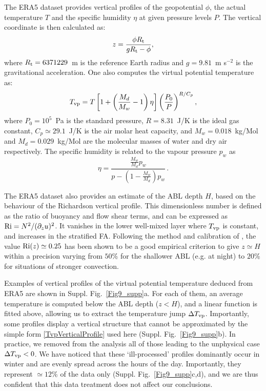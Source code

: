 The ERA5 dataset provides vertical profiles of the geopotential $\phi$, the actual temperature $T$ and the specific humidity $\eta$ at given pressure levels $P$. The vertical coordinate is then calculated as:
%
\begin{equation}
z = \frac{\phi R_{\textup{t}}}{g R_{\textup{t}} - \phi},
\end{equation}
%
where $R_{\textup{t}} = 6371229$~m is the reference Earth radius and $g = 9.81$~m s$^{-2}$ is the gravitational acceleration. One also computes the virtual potential temperature as:
%
\begin{equation}
T_{\textup{vp}} = T\left[1 + \left(\frac{M_d}{M_w} - 1\right) \eta \right] \left(\frac{P_{0}}{P}\right)^{R/C_p},
\end{equation}
%
where $P_{0} = 10^{5}$~Pa is the standard pressure, $R = 8.31$~J/K is the ideal gas constant, $C_p \simeq 29.1$~J/K is the air molar heat capacity, and $M_w = 0.018$~kg/Mol and $M_d = 0.029$~kg/Mol are the molecular masses of water and dry air respectively. The specific humidity is related to the vapour pressure $p_w$ as
%
\begin{equation}
\eta = \frac{\frac{M_w}{M_d} p_w}{p - \left( 1 - \frac{M_w}{M_d} \right) p_w} \, .
\end{equation}
%

The ERA5 dataset also provides an estimate of the ABL depth $H$, based on the behaviour of the Richardson vertical profile. This dimensionless number is defined as the ratio of buoyancy and flow shear terms, and can be expressed as $\textup{Ri} = N^2/(\partial_z u)^2$. It vanishes in the lower well-mixed layer where $T_{\textup{vp}}$ is constant, and increases in the stratified FA. Following the method and calibration of \citet{Vogelezang1996,seidel2012}, the value $\textup{Ri}(z) \simeq 0.25$ has been shown to be a good empirical criterion to give $z \simeq H$ within a precision varying from $50$\% for the shallower ABL (e.g. at night) to $20$\% for situations of stronger convection.

Examples of vertical profiles of the virtual potential temperature deduced from ERA5 are shown in Suppl. Fig.~\ref{Fig9_supp}a. For each of them, an average temperature is computed below the ABL depth ($z<H$), and a linear function is fitted above, allowing us to extract the temperature jump $\Delta T_{\textup{vp}}$. Importantly, some profiles display a vertical structure that cannot be approximated by the simple form \eqref{TvpVerticalProfile} used here (Suppl. Fig.~\ref{Fig9_supp}b). In practice, we removed from the analysis all of those leading to the unphysical case $\Delta T_{\textup{vp}}<0$. We have noticed that these `ill-processed' profiles dominantly occur in winter and are evenly spread across the hours of the day. Importantly, they represent $\simeq12$\% of the data only (Suppl. Fig.~\ref{Fig9_supp}c,d), and we are thus confident that this data treatment does not affect our conclusions.



